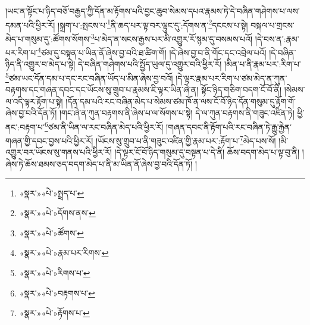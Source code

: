 །ཡང་ན་སྟོང་པ་ཉིད་བཅོ་བརྒྱད་ཀྱི་དོན་མ་རྟོགས་པའི་བྱང་ཆུབ་སེམས་དཔའ་རྣམས་ཏེ་དེ་བཞིན་གཤེགས་པ་ལས་དམན་པའི་ཕྱིར་རོ། །སྐྲག་པ་:སྤངས་པ་\footnote{«སྣར་»«པེ་»སྤྲད་པ་}ནི་ཆད་པར་ལྟ་བར་ལྟུང་དུ་:དོགས་ན་\footnote{«སྣར་»«པེ་»དོགས་ནས་}དངངས་པ་སྟེ། བསྐལ་པ་གྲངས་མེད་པ་གསུམ་དུ་:ཚོགས་སོགས་\footnote{«སྣར་»«པེ་»ཚོགས་}པ་མེད་ན་སངས་རྒྱས་པར་མི་འགྱུར་རོ་སྙམ་དུ་བསམས་པའོ། །དེ་བས་ན་:རྣམ་པར་རིག་པ་\footnote{«སྣར་»«པེ་»རྣམ་པར་རིགས་}ཙམ་དུ་བསྟན་པ་ཡིན་ནོ་ཞེས་བྱ་བའི་ཐ་ཚིག་གོ། །དེ་ཞེས་བྱ་བ་ནི་གོང་དང་འབྲེལ་པའོ། །དེ་བཞིན་ཉིད་ནི་འགྱུར་བ་མེད་པ་སྟེ། དེ་བཞིན་གཤེགས་པའི་སྤྱོད་ཡུལ་དུ་འགྱུར་བའི་ཕྱིར་རོ། །མིན་པ་ནི་རྣམ་པར་:རིག་པ་\footnote{«སྣར་»«པེ་»རིགས་པ་}ཙམ་ཡང་དོན་དམ་པ་དང་རང་བཞིན་ཡོད་པ་མིན་ཞེས་བྱ་བའོ། །དེ་ལྟར་རྣམ་པར་རིག་པ་ཙམ་མེད་ན་ཀུན་བརྟགས་དང་གཞན་དབང་དང་ཡོངས་སུ་གྲུབ་པ་རྣམས་ཇི་ལྟར་ཡིན་ཞེ་ན། སྟོང་ཉིད་གཅིག་བདག་ངོ་བོ་ནི། །སེམས་ལ་འདི་ལྟར་རྟོག་པ་སྟེ། །དོན་དམ་པའི་རང་བཞིན་མེད་པ་སེམས་ཙམ་ཁོ་ན་ལས་ངོ་བོ་ཉིད་དོན་གསུམ་དུ་རྟོག་གོ་ཞེས་བྱ་བའི་དོན་ཏོ། །གང་ཞེ་ན་ཀུན་བརྟགས་ནི་ཞེས་པ་ལ་སོགས་པ་སྟེ། དེ་ལ་ཀུན་བརྟགས་ནི་གཟུང་འཛིན་ཏེ། ཕྱི་ནང་:བརྟག་པ་\footnote{«སྣར་»«པེ་»བརྟགས་པ་}ཙམ་ནི་ཡིན་ལ་རང་བཞིན་མེད་པའི་ཕྱིར་རོ། །གཞན་དབང་ནི་རྟོག་པའི་རང་བཞིན་ཏེ་རྒྱུ་རྐྱེན་གཞན་གྱི་དབང་བྱས་པའི་ཕྱིར་རོ། །ཡོངས་སུ་གྲུབ་པ་ནི་གཟུང་འཛིན་གྱི་རྣམ་པར་:རྟོག་པ་\footnote{«སྣར་»«པེ་»རྟོགས་པ་}མེད་པས་སོ། །མི་འགྱུར་བར་ཡོངས་སུ་གནས་པའི་ཕྱིར་རོ། །དེ་ལྟར་ངོ་བོ་ཉིད་གསུམ་དུ་བསྟན་པ་དེ་ནི། ཆོས་བདག་མེད་པ་ལྟ་བུ་ནི། །ཞེས་ཏེ་ཆོས་ཐམས་ཅད་བདག་མེད་པ་ནི་མ་ཡིན་ནོ་ཞེས་བྱ་བའི་དོན་ཏོ། །
